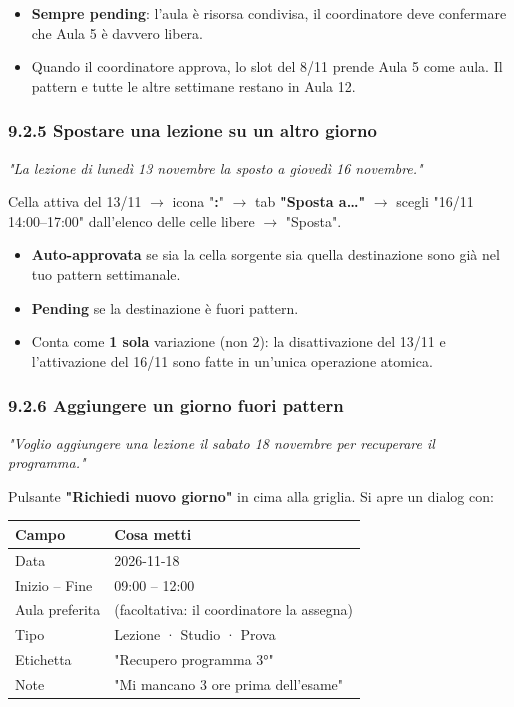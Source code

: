 \documentclass[11pt,a4paper]{article}
\renewenvironment{quote}
  {\begin{list}{}{%
      \setlength{\leftmargin}{8pt}%
      \setlength{\rightmargin}{8pt}%
      \setlength{\topsep}{6pt}%
      \setlength{\parsep}{0pt}}%
      \item\relax\color{black!75}\itshape}
  {\end{list}}
\begin{document}
\begin{itemize}
  \item \textbf{Sempre pending}: l'aula è risorsa condivisa, il coordinatore deve confermare che Aula 5 è davvero libera.
  \item Quando il coordinatore approva, lo slot del 8/11 prende Aula 5 come aula. Il pattern e tutte le altre settimane restano in Aula 12.
\end{itemize}

\subsubsection{9.2.5 Spostare una lezione su un altro giorno}


\begin{quote}
\textit{"La lezione di lunedì 13 novembre la sposto a giovedì 16 novembre."}
\end{quote}

Cella attiva del 13/11 $\rightarrow$ icona "\textbf{\textbf{:}}" $\rightarrow$ tab \textbf{"Sposta a\ldots{}"} $\rightarrow$ scegli "16/11 14:00--17:00" dall'elenco delle celle libere $\rightarrow$ "Sposta".

\begin{itemize}
  \item \textbf{Auto-approvata} se sia la cella sorgente sia quella destinazione sono già nel tuo pattern settimanale.
  \item \textbf{Pending} se la destinazione è fuori pattern.
  \item Conta come \textbf{1 sola} variazione (non 2): la disattivazione del 13/11 e l'attivazione del 16/11 sono fatte in un'unica operazione atomica.
\end{itemize}

\subsubsection{9.2.6 Aggiungere un giorno fuori pattern}


\begin{quote}
\textit{"Voglio aggiungere una lezione il sabato 18 novembre per recuperare il programma."}
\end{quote}

Pulsante \textbf{"Richiedi nuovo giorno"} in cima alla griglia. Si apre un dialog con:

\begin{table}[H]
\centering
\small
\begin{tabularx}{\linewidth}{|X|X|}
\hline
\rowcolor{tableheader} Campo & Cosa metti \\
\hline
Data & 2026-11-18 \\
\hline
Inizio -- Fine & 09:00 -- 12:00 \\
\hline
Aula preferita & (facoltativa: il coordinatore la assegna) \\
\hline
Tipo & Lezione · Studio · Prova \\
\hline
Etichetta & "Recupero programma 3°" \\
\hline
Note & "Mi mancano 3 ore prima dell'esame" \\
\hline
\end{tabularx}
\end{table}
\end{document}
